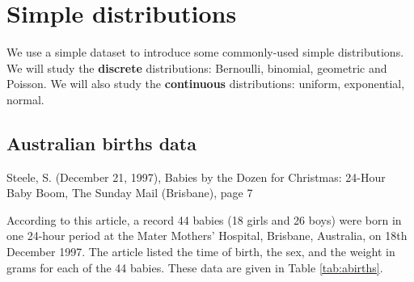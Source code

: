 \documentclass[
  british,
  11pt,
  openany, a4paper]{book}
\begin{document}
\chapter{Simple distributions}\label{simple}

We use a simple dataset to introduce some commonly-used simple distributions. We will study the \textbf{discrete} distributions: Bernoulli, binomial, geometric and Poisson. We will also study the \textbf{continuous} distributions: uniform, exponential, normal.

\section{Australian births data}\label{australian-births-data}

Steele, S. (December 21, 1997), Babies by the Dozen for Christmas: 24-Hour Baby Boom, The Sunday Mail (Brisbane), page 7

According to this article, a record 44 babies (18 girls and 26 boys) were born in one 24-hour period at the Mater Mothers' Hospital, Brisbane, Australia, on 18th December 1997. The article listed the time of birth, the sex, and the weight in grams for each of the 44 babies. These data are given in Table \ref{tab:abirths}.

 
  \providecommand{\huxb}[2]{\arrayrulecolor[RGB]{#1}\global\arrayrulewidth=#2pt}
  \providecommand{\huxvb}[2]{\color[RGB]{#1}\vrule width #2pt}
  \providecommand{\huxtpad}[1]{\rule{0pt}{#1}}
  \providecommand{\huxbpad}[1]{\rule[-#1]{0pt}{#1}}
\end{document}

